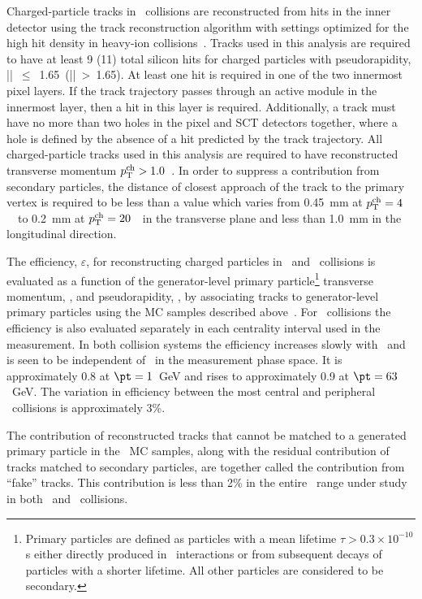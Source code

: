 Charged-particle tracks in \pbpb\ collisions are reconstructed from hits in the inner detector using the 
track reconstruction algorithm with settings optimized for the high hit density in heavy-ion
collisions~\cite{Aaboud:2017all}.
Tracks used in this analysis  are required to have at least 9 (11) total silicon hits for charged particles with pseudorapidity,  \mbox{|\etatrk| $\leq$ 1.65 (|\etatrk| > 1.65)}.  At least one hit is required in one of the two innermost pixel layers.
If the track trajectory passes through an active module in the innermost layer, then 
a hit in this layer is required. Additionally, a track must 
have no more than two holes in the pixel and SCT detectors together, where 
a hole is defined by the absence of a hit predicted by the track 
trajectory. 
All charged-particle tracks used in this analysis are required to have reconstructed transverse momentum $\mbox{$p_{\mathrm{T}}^{\mathrm{ch}}$} > 1.0 $~\GeV. In order to suppress a contribution from
secondary particles, the distance of closest approach of the track to the primary vertex is required to be less than a value which varies from  0.45~mm at $\mbox{$p_{\mathrm{T}}^{\mathrm{ch}}$}=4$~\GeV\ to 0.2~mm at $\mbox{$p_{\mathrm{T}}^{\mathrm{ch}}$}=20$~\GeV\ in the transverse plane and less than 1.0~mm in the longitudinal direction.


The efficiency, $\varepsilon$, for reconstructing charged particles in \PbPb\ and \pp\ collisions is evaluated as a function of the generator-level primary particle\footnote{Primary particles are defined as particles with a mean lifetime $\tau>0.3\times 10^{-10}$s either directly produced in \pp\ interactions or from subsequent decays of particles with a shorter lifetime. All other particles are considered to be secondary.} transverse momentum, \pTtrue, and pseudorapidity, \etatrue, by associating tracks to generator-level primary particles using the MC samples described above~\cite{Aad:2010ah}. For \pbpb\ collisions the efficiency is also evaluated separately in each centrality interval used in the measurement. In both collision systems the efficiency increases slowly with \pTtrue\ and is seen to be independent of \ptjet\ in the measurement phase space. It is approximately 0.8 at \mbox{$\pt = 1$ GeV} and rises to approximately 0.9 at \mbox{$\pt = 63$ GeV}. The variation in efficiency between the most central and peripheral \pbpb\ collisions is approximately 3\%.

The contribution of reconstructed tracks that cannot be matched to a generated primary particle in the \pp\ MC samples, along with the residual contribution of tracks matched to secondary particles, are together called the contribution from ``fake'' tracks. This contribution is less than 2\% in the entire \pttrk\ range under study in both \pp\ and \pbpb\ collisions.  








